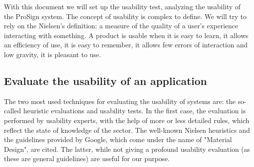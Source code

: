 \lhead{}
With this document we will set up the usability test, analyzing the usability of the ProSign system. The concept of usability is complex to define. We will try to rely on the Nielsen's definition: a measure of the quality of a user's experience interacting with something. A product is usable when it is easy to learn, it allows an efficiency of use, it is easy to remember, it allows few errors of interaction and low gravity, it is pleasant to use.\\
\subsection{Evaluate the usability of an application}
The two most used techniques for evaluating the usability of systems are: the so-called heuristic evaluations and usability tests. In the first case, the evaluation is performed by usability experts, with the help of more or less detailed rules, which reflect the state of knowledge of the sector. The well-known Nielsen heuristics and the guidelines provided by Google, which come under the name of "Material Design", are cited. The latter, while not giving a profound usability evaluation (as these are general guidelines) are useful for our purpose.\\
